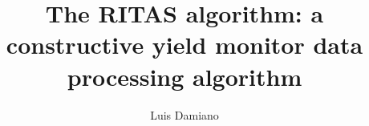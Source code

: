 
\@makechapterheada\titlepage  %
\title{The RITAS algorithm: a constructive yield monitor data
  processing algorithm}

\author{Luis Damiano}








